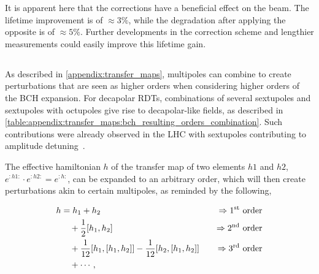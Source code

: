 It is apparent here that the corrections have a beneficial effect on the beam. The lifetime
improvement is of $\approx 3 \%$, while the degradation after applying the opposite is of $\approx
5\%$. Further developments in the correction scheme and lengthier measurements could easily improve
this lifetime gain.






\subsection{}
\label{section:decapoles:feed_up}


\subsubsection{}

As described in \cref{appendix:transfer_maps}, multipoles can combine to create perturbations that
are seen as higher orders when considering higher orders of the BCH expansion.
For decapolar RDTs, combinations of several sextupoles and sextupoles with octupoles give rise to
decapolar-like fields, as described in
\cref{table:appendix:transfer_maps:bch_resulting_orders_combination}. 
Such contributions were already observed in the LHC with sextupoles contributing to amplitude
detuning~\cite{soubelet_simulations_nodate}.

The effective hamiltonian $h$ of the transfer map of two elements $h1$ and $h2$, $e^{:h1:} \cdot
e^{:h2:} = e^{:h:}$, can be expanded to an arbitrary order, which will then create perturbations
akin to certain multipoles, as reminded by the following,

\begin{equation}
    \begin{aligned}
        h &= h_1 + h_2 \quad &\Rightarrow \text{1\textsuperscript{st} order} \\
        &\quad + \frac{1}{2} [h_1, h_2] \quad &\Rightarrow \text{2\textsuperscript{nd} order} \\
        &\quad + \frac{1}{12} [h_1, [h_1, h_2]] - \frac{1}{12} [h_2, [h_1, h_2]] \quad &\Rightarrow \text{3\textsuperscript{rd} order} \\
        &\quad + \cdots,
    \end{aligned}
    \nonumber
\end{equation}

